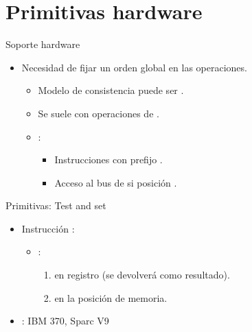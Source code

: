 \section{Primitivas hardware}

\begin{frame}[t]{Soporte hardware}
\begin{itemize}
  \item Necesidad de fijar un orden global en las operaciones.
    \begin{itemize}
      \item Modelo de consistencia puede ser .

      \item Se suele  con operaciones de .

      \item {}:
        \begin{itemize}
          \item Instrucciones con prefijo .
          \item Acceso al bus de  si posición .
        \end{itemize}
    \end{itemize}
\end{itemize}
\end{frame}

\begin{frame}[t]{Primitivas: Test and set}
\begin{itemize}
  \item Instrucción :
    \begin{itemize}
      \item {}:
        \begin{enumerate}
          \item {} en registro (se devolverá como resultado).
          \item {}  en la posición de memoria.
        \end{enumerate}
    \end{itemize}

  \item {}: IBM 370, Sparc V9
      
\end{itemize}
\end{frame}

